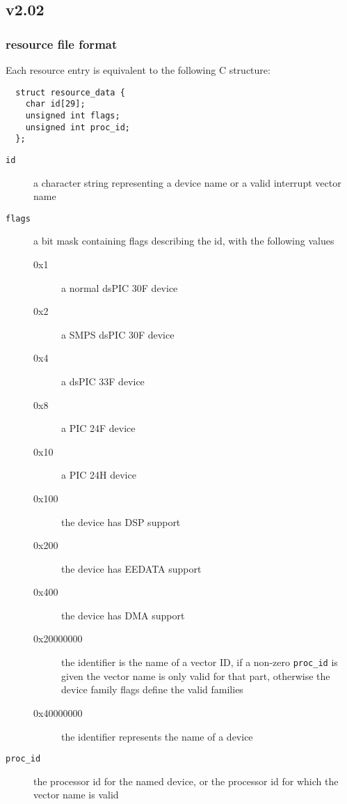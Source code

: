 \documentclass{article}
\begin{document}
\subsection{v2.02}

  \subsubsection{resource file format}

  Each resource entry is equivalent to the following C structure:
  \begin{verbatim}
  struct resource_data {
    char id[29];
    unsigned int flags;
    unsigned int proc_id;
  };
  \end{verbatim}

  \begin{description}
    \item [\texttt{id}] a character string representing a device name or
                        a valid interrupt vector name

    \item [\texttt{flags}] a bit mask containing flags describing the id, with 
                           the following values
    \begin{description}
      \item [0x1] a normal dsPIC 30F device
      \item [0x2] a SMPS dsPIC 30F device
      \item [0x4] a dsPIC 33F device
      \item [0x8] a PIC 24F device
      \item [0x10] a PIC 24H device
      \item [0x100] the device has DSP support
      \item [0x200] the device has EEDATA support
      \item [0x400] the device has DMA support
      \item [0x20000000] the identifier is the name of a vector ID, if a
                         non-zero \texttt{proc\_id} is given the vector name is
                         only valid for that part, otherwise the device family
                         flags define the valid families
      \item [0x40000000] the identifier represents the name of a device
    \end{description}

    \item [\texttt{proc\_id}] the processor id for the named device, or the
                              processor id for which the vector name is valid
   \end{description}
\end{document}
